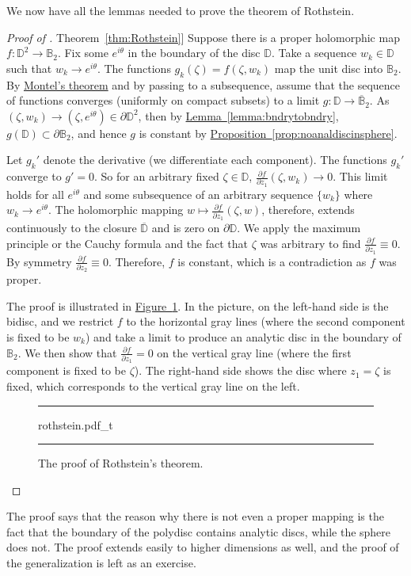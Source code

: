 \documentclass[12pt,openany]{book}
\newcommand{\D}{{\mathbb{D}}}
\newcommand{\bB}{{\mathbb{B}}}
\theoremstyle{plain}
\theoremstyle{remark}
\theoremstyle{definition}
\newenvironment{myfig}{%
\begin{figure}[h!t]
\noindent\rule{\textwidth}{0.5pt}\vspace{12pt}\par\centering}%
{\par\noindent\rule{\textwidth}{0.5pt}
\end{figure}}
\theoremstyle{exercise}
\theoremstyle{example}
\newcommand{\figureref}[1]{\hyperref[#1]{Figure~\ref*{#1}}}
\newcommand{\thmref}[1]{\hyperref[#1]{Theorem~\ref*{#1}}}
\newcommand{\propref}[1]{\hyperref[#1]{Proposition~\ref*{#1}}}
\newcommand{\lemmaref}[1]{\hyperref[#1]{Lemma~\ref*{#1}}}
\begin{document}
We now have all the lemmas needed to prove the theorem of Rothstein.

\begin{proof}[Proof of \thmref{thm:Rothstein}]
Suppose there is a proper holomorphic map $f \colon \D^2
\to \bB_2$.
Fix some $e^{i\theta}$ in the boundary of the disc $\D$.  Take a sequence
$w_k \in \D$ such that $w_k \to e^{i\theta}$.   The functions
$g_k(\zeta) =  f(\zeta,w_k)$ map the unit disc into $\bB_2$.
By \hyperref[thm:onevarmontel]{Montel's theorem} and
by passing to a subsequence, assume that
the sequence of functions converges (uniformly on compact subsets) to
a limit $g \colon \D \to \overline{\bB}_2$.  As $(\zeta,w_k) \to
(\zeta,e^{i\theta}) \in \partial \D^2$, then by
\lemmaref{lemma:bndrytobndry}, $g(\D) \subset \partial \bB_2$,
and hence $g$ is constant by \propref{prop:noanaldiscinsphere}.

Let $g_k'$ denote the derivative (we differentiate each component).
The functions $g_k'$ converge to $g' = 0$.
So for an arbitrary fixed $\zeta \in \D$,
$\frac{\partial f}{\partial z_1} (\zeta, w_k) \to 0$.
This limit holds for all $e^{i\theta}$ and some subsequence of
an arbitrary sequence $\{ w_k \}$ where $w_k \to e^{i\theta}$.  The
holomorphic mapping $w \mapsto \frac{\partial f}{\partial z_1} (\zeta, w)$,
therefore, extends continuously
to the closure $\overline{\D}$ and is zero on $\partial \D$.
We apply the maximum
principle or the Cauchy formula and the fact that $\zeta$ was arbitrary to find
$\frac{\partial f}{\partial z_1} \equiv 0$.  By symmetry
$\frac{\partial f}{\partial z_2} \equiv 0$.  Therefore, $f$ is constant,
which is a contradiction as $f$ was proper.

The proof is illustrated in \figureref{fig:rothstein}.
In the picture, on the left-hand side is the bidisc, and we
restrict $f$ to the horizontal gray lines (where the second component is
fixed to be $w_k$) and take a limit to produce an analytic disc
in the boundary of $\bB_2$.  We then show that $\frac{\partial f}{\partial
z_1} = 0$ on the vertical gray line (where the first component is fixed to
be $\zeta$).  The right-hand side shows the disc where $z_1 = \zeta$ is
fixed, which corresponds to the vertical gray line on the left.
\begin{myfig}
{rothstein.pdf_t}
\caption{The proof of Rothstein's theorem.\label{fig:rothstein}}
\end{myfig}
\end{proof}

The proof says that the reason why there is not even a proper mapping is the fact
that the boundary of the polydisc contains analytic discs, while
the sphere does not.
The proof extends easily to higher dimensions as well, and the proof
of the generalization is left as an exercise.
\end{document}
